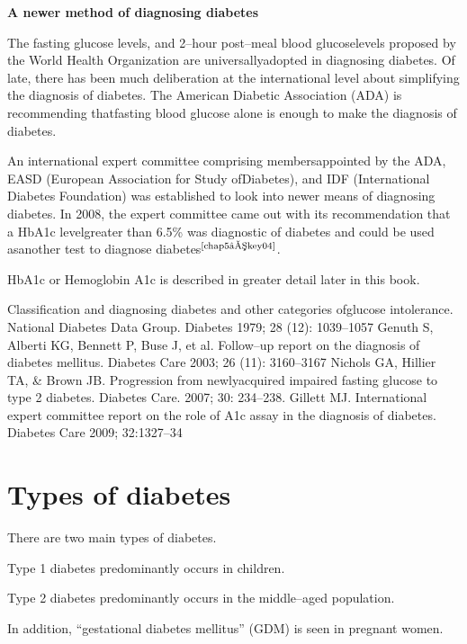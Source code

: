 \noindent
\textbf{A newer method of diagnosing diabetes}

The fasting glucose levels, and 2–hour post–meal blood glu\-cose\break levels proposed by the World Health Organization are universally\break ado\-pted in diagnosing diabetes. Of late, there has been much delibe\-ration at the international level about simplifying the diagnosis of diabetes. The American Diabetic Association (ADA) is recommending that\break fasting blood glucose alone is enough to make the diagnosis of diabetes.


An international expert committee comprising members\break appoin\-ted by the ADA, EASD (European Association for Study of\break Diabetes), and IDF (International Diabetes Foundation) was established to look into newer means of diagnosing diabetes. In 2008, the expert commi\-ttee came out with its recommendation that a HbA1c level\break greater than 6.5\% was diagnostic of diabetes and could be used as\break another test to diagnose diabetes$^{\text{\cite{chap5–key04}}}$.

HbA1c or Hemoglobin A1c is described in greater detail later in this book.

\begin{thebibliography}{99}
 Classification and diagnosing diabetes and other categories of\break glucose intolerance. National Diabetes Data Group. Diabetes 1979; 28 (12): 1039–1057
  Genuth S, Alberti KG, Bennett P, Buse J, et al. Follow–up report on the diagnosis of diabetes mellitus. Diabetes Care 2003; 26 (11): 3160–3167
  Nichols GA, Hillier TA, \& Brown JB. Progression from newly\break acquired impaired fasting glucose to type 2 diabetes. Diabetes Care. 2007; 30: 234–238.
  Gillett MJ. International expert committee report on the role of A1c assay in the diagnosis of diabetes. Diabetes Care 2009; 32:1327–34
 \end{thebibliography}


\chapter{Types of diabetes}\label{chap6}

There are two main types of diabetes.

Type 1 diabetes predominantly occurs in children.

Type 2 diabetes predominantly occurs in the middle–aged popu\-lation.

In addition, “gestational diabetes mellitus” (GDM) is seen in pregnant women.

